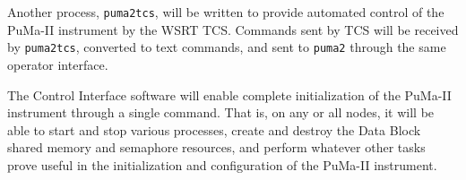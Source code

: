 Another process, {\tt puma2tcs}, will be written to provide automated
control of the PuMa-II instrument by the WSRT TCS.  Commands sent by
TCS will be received by {\tt puma2tcs}, converted to text commands,
and sent to {\tt puma2} through the same operator interface.

The Control Interface software will enable complete initialization of
the PuMa-II instrument through a single command.  That is, on any or
all nodes, it will be able to start and stop various processes, create
and destroy the Data Block shared memory and semaphore resources, and
perform whatever other tasks prove useful in the initialization and
configuration of the PuMa-II instrument.

